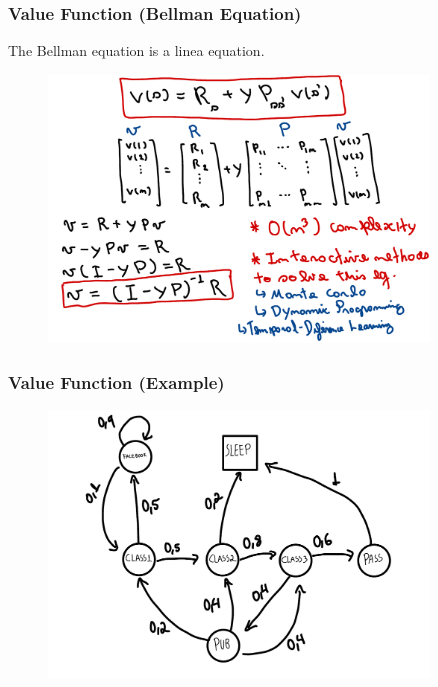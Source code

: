 \begin{frame}
    \frametitle{Value Function (Bellman Equation)}
    The Bellman equation is a linea equation.
    \begin{figure}
        \centering
        \includegraphics[width=0.9\textwidth]{sections/markov/figures/bellman_eq_matrix_form.pdf}
    \end{figure}

\end{frame}


\begin{frame}
    \frametitle{Value Function (Example)}
    \begin{figure}
        \centering
        \includegraphics[width=0.9\textwidth]{sections/markov/figures/student_example.pdf}
    \end{figure}
\end{frame}

